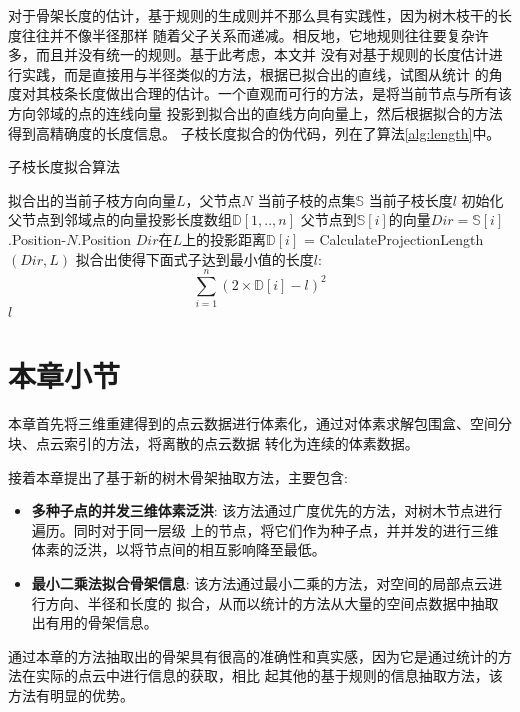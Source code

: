 对于骨架长度的估计，基于规则的生成则并不那么具有实践性，因为树木枝干的长度往往并不像半径那样
随着父子关系而递减。相反地，它地规则往往要复杂许多，而且并没有统一的规则。基于此考虑，本文并
没有对基于规则的长度估计进行实践，而是直接用与半径类似的方法，根据已拟合出的直线，试图从统计
的角度对其枝条长度做出合理的估计。一个直观而可行的方法，是将当前节点与所有该方向邻域的点的连线向量
投影到拟合出的直线方向向量上，然后根据拟合的方法得到高精确度的长度信息。
子枝长度拟合的伪代码，列在了算法\ref{alg:length}中。

\begin{algorithm}[H]
	\caption{子枝长度拟合算法}
	\label{alg:length}
	\begin{algorithmic}[1] 
		\Require 拟合出的当前子枝方向向量$L$，父节点$N$
		\Require 当前子枝的点集$\mathbb{S}$
		\Ensure 当前子枝长度$l$
		\State 初始化父节点到邻域点的向量投影长度数组$\mathbb{D}[1,..,n]$
		\State 父节点到$\mathbb{S}[i]$的向量$Dir=\mathbb{S}[i]$.Position-$N$.Position
		\State $Dir$在$L$上的投影距离$\mathbb{D}[i]$ = CalculateProjectionLength$(Dir, L)$
		\EndFor
		\State 拟合出使得下面式子达到最小值的长度$l$:\[ \sum_{i=1}^n (2\times \mathbb{D}[i] - l)^2  \]
		\State \Return $l$
	\end{algorithmic}
\end{algorithm}

\section{本章小节}

本章首先将三维重建得到的点云数据进行体素化，通过对体素求解包围盒、空间分块、点云索引的方法，将离散的点云数据
转化为连续的体素数据。

接着本章提出了基于新的树木骨架抽取方法，主要包含:\\
\begin{itemize}
	\item \textbf{多种子点的并发三维体素泛洪}: 该方法通过广度优先的方法，对树木节点进行遍历。同时对于同一层级
		上的节点，将它们作为种子点，并并发的进行三维体素的泛洪，以将节点间的相互影响降至最低。
	\item \textbf{最小二乘法拟合骨架信息}: 该方法通过最小二乘的方法，对空间的局部点云进行方向、半径和长度的
		拟合，从而以统计的方法从大量的空间点数据中抽取出有用的骨架信息。
\end{itemize}

通过本章的方法抽取出的骨架具有很高的准确性和真实感，因为它是通过统计的方法在实际的点云中进行信息的获取，相比
起其他的基于规则的信息抽取方法，该方法有明显的优势。
